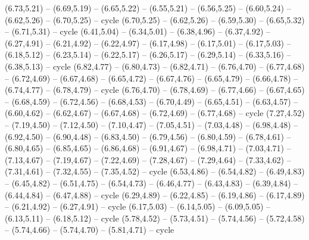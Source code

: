\expandafter\def\csname geo:gebiet:LVA\endcsname{
  (6.73,5.21) -- (6.69,5.19) -- (6.65,5.22) -- (6.55,5.21) -- (6.56,5.25) -- (6.60,5.24) -- (6.62,5.26) -- (6.70,5.25) -- cycle}
\expandafter\def\csname geo:gebiet:EST\endcsname{
  (6.70,5.25) -- (6.62,5.26) -- (6.59,5.30) -- (6.65,5.32) -- (6.71,5.31) -- cycle}
\expandafter\def\csname geo:gebiet:DEU\endcsname{
  (6.41,5.04) -- (6.34,5.01) -- (6.38,4.96) -- (6.37,4.92) -- (6.27,4.91) -- (6.21,4.92) -- (6.22,4.97) -- (6.17,4.98) -- (6.17,5.01) -- (6.17,5.03) -- (6.18,5.12) -- (6.23,5.14) -- (6.22,5.17) -- (6.26,5.17) -- (6.29,5.14) -- (6.33,5.16) -- (6.38,5.13) -- cycle}
\expandafter\def\csname geo:gebiet:BGR\endcsname{
  (6.82,4.77) -- (6.80,4.73) -- (6.82,4.71) -- (6.76,4.70) -- (6.77,4.68) -- (6.72,4.69) -- (6.67,4.68) -- (6.65,4.72) -- (6.67,4.76) -- (6.65,4.79) -- (6.66,4.78) -- (6.74,4.77) -- (6.78,4.79) -- cycle}
\expandafter\def\csname geo:gebiet:GRC\endcsname{
  (6.76,4.70) -- (6.78,4.69) -- (6.77,4.66) -- (6.67,4.65) -- (6.68,4.59) -- (6.72,4.56) -- (6.68,4.53) -- (6.70,4.49) -- (6.65,4.51) -- (6.63,4.57) -- (6.60,4.62) -- (6.62,4.67) -- (6.67,4.68) -- (6.72,4.69) -- (6.77,4.68) -- cycle}
\expandafter\def\csname geo:gebiet:TUR\endcsname{
  (7.27,4.52) -- (7.19,4.50) -- (7.12,4.50) -- (7.10,4.47) -- (7.05,4.51) -- (7.03,4.48) -- (6.98,4.48) -- (6.92,4.50) -- (6.90,4.48) -- (6.83,4.50) -- (6.79,4.56) -- (6.80,4.59) -- (6.78,4.61) -- (6.80,4.65) -- (6.85,4.65) -- (6.86,4.68) -- (6.91,4.67) -- (6.98,4.71) -- (7.03,4.71) -- (7.13,4.67) -- (7.19,4.67) -- (7.22,4.69) -- (7.28,4.67) -- (7.29,4.64) -- (7.33,4.62) -- (7.31,4.61) -- (7.32,4.55) -- (7.35,4.52) -- cycle}
\expandafter\def\csname geo:gebiet:ALB\endcsname{
  }
\expandafter\def\csname geo:gebiet:HRV\endcsname{
  (6.53,4.86) -- (6.54,4.82) -- (6.49,4.83) -- (6.45,4.82) -- (6.51,4.75) -- (6.54,4.73) -- (6.46,4.77) -- (6.43,4.83) -- (6.39,4.84) -- (6.44,4.84) -- (6.47,4.88) -- cycle}
\expandafter\def\csname geo:gebiet:CHE\endcsname{
  (6.29,4.89) -- (6.22,4.85) -- (6.19,4.86) -- (6.17,4.89) -- (6.21,4.92) -- (6.27,4.91) -- cycle}
\expandafter\def\csname geo:gebiet:LUX\endcsname{
  }
\expandafter\def\csname geo:gebiet:BEL\endcsname{
  }
\expandafter\def\csname geo:gebiet:NLD\endcsname{
  (6.17,5.03) -- (6.14,5.05) -- (6.09,5.05) -- (6.13,5.11) -- (6.18,5.12) -- cycle}
\expandafter\def\csname geo:gebiet:PRT\endcsname{
  (5.78,4.52) -- (5.73,4.51) -- (5.74,4.56) -- (5.72,4.58) -- (5.74,4.66) -- (5.74,4.70) -- (5.81,4.71) -- cycle}
